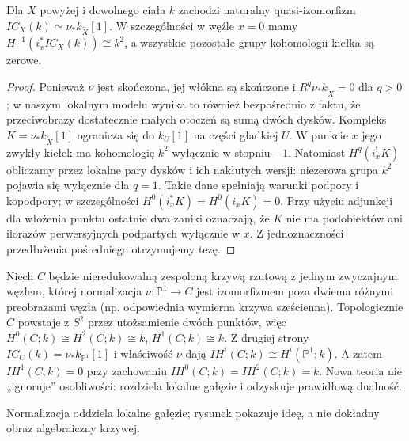 \begin{stwierdzenie}
\label{prop:node-ic-xiii}
Dla $X$ powyżej i dowolnego ciała $k$ zachodzi
naturalny quasi-izomorfizm
$IC_X(k)\simeq\nu_*k_{\widetilde X}[1]$.
W szczególności w węźle $x=0$ mamy
$H^{-1}(i_x^*IC_X(k))\cong k^2$,
a wszystkie pozostałe grupy kohomologii kiełka
są zerowe.
\end{stwierdzenie}
\begin{proof}
Ponieważ $\nu$ jest skończona, jej włókna są
skończone i $R^q\nu_*k_{\widetilde X}=0$ dla $q>0$;
w naszym lokalnym modelu wynika to również
bezpośrednio z faktu, że przeciwobrazy dostatecznie
małych otoczeń są sumą dwóch dysków.
Kompleks $K=\nu_*k_{\widetilde X}[1]$ ogranicza się
do $k_U[1]$ na części gładkiej $U$.
W punkcie $x$ jego zwykły kiełek ma kohomologię
$k^2$ wyłącznie w stopniu $-1$. Natomiast
$H^q(i_x^!K)$ obliczamy przez lokalne pary
dysków i ich nakłutych wersji: niezerowa grupa
$k^2$ pojawia się wyłącznie dla $q=1$.
Takie dane spełniają warunki podpory i kopodpory;
w szczególności $H^0(i_x^*K)=H^0(i_x^!K)=0$.
Przy użyciu adjunkcji dla włożenia punktu
ostatnie dwa zaniki oznaczają, że $K$ nie ma
podobiektów ani ilorazów perwersyjnych
podpartych wyłącznie w $x$. Z jednoznaczności
przedłużenia pośredniego otrzymujemy tezę.
\end{proof}

\begin{przyklad}
Niech $C$ będzie nieredukowalną zespoloną
krzywą rzutową z jednym zwyczajnym węzłem,
której normalizacja $\nu:\mathbb P^1\to C$
jest izomorfizmem poza dwiema różnymi preobrazami
węzła (np. odpowiednia wymierna krzywa sześcienna).
Topologicznie $C$ powstaje z $S^2$ przez
utożsamienie dwóch punktów, więc
$H^0(C;k)\cong H^2(C;k)\cong k$,
$H^1(C;k)\cong k$.
Z drugiej strony
$IC_C(k)=\nu_*k_{\mathbb P^1}[1]$ i właściwość $\nu$
dają $IH^i(C;k)\cong H^i(\mathbb P^1;k)$.
A zatem $IH^1(C;k)=0$ przy zachowaniu
$IH^0(C;k)=IH^2(C;k)=k$.
Nowa teoria nie „ignoruje” osobliwości: rozdziela
lokalne gałęzie i odzyskuje prawidłową dualność.
\end{przyklad}

\begin{center}
\par\smallskip\small Normalizacja oddziela lokalne gałęzie; rysunek
pokazuje ideę, a nie dokładny obraz algebraiczny krzywej.
\end{center}

